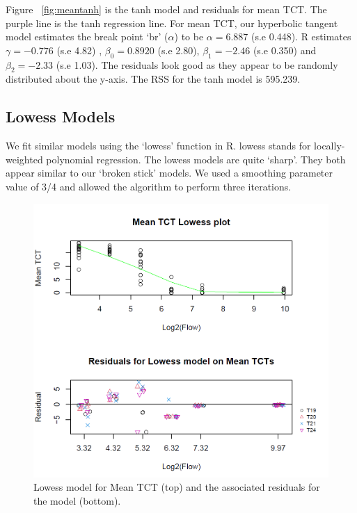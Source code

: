 Figure ~\ref{fig:meantanh} is the tanh model and residuals for mean TCT. The purple line is the tanh regression line. For mean TCT, our hyperbolic tangent model estimates the break point `br' ($\alpha$) to be $\alpha=6.887$ (s.e 0.448). R estimates $\gamma= -0.776$ (s.e 4.82) , $\beta_{0}=0.8920$ (s.e 2.80), $\beta_{1}=-2.46$ (s.e 0.350) and $\beta_{2}=-2.33$ (s.e 1.03). The residuals look good as they appear to be randomly distributed about the y-axis. The RSS for the tanh model is 595.239.


\subsection{Lowess Models}

We fit similar models using the `lowess' function in R. lowess stands for locally-weighted polynomial regression.
 The lowess models are quite `sharp'. They both appear similar to our `broken stick' models. We used a smoothing parameter value of 3/4 and allowed the algorithm to perform three iterations.



\begin{figure}[H]
\includegraphics[scale=0.7]{Chapter4Images/meantctlowess.png}
\caption{Lowess model for Mean TCT (top) and the associated residuals for the model (bottom).}
\label{fig:meanlowess}
\end{figure}


